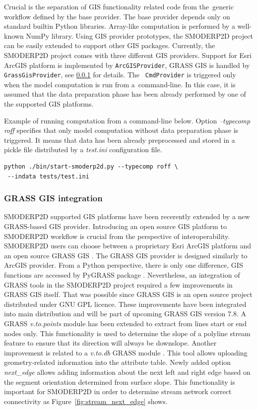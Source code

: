 Crucial is the separation of GIS functionality related code from
the~generic workflow defined by the base provider. The base provider
depends only on standard builtin Python libraries. Array-like
computation is performed by a well-known NumPy library. Using GIS
provider prototypes, the SMODERP2D project can be easily extended to
support other GIS packages. Currently, the SMODERP2D project comes
with three different GIS providers. Support for Esri ArcGIS platform
is implemented by {\tt ArcGISProvider}, GRASS GIS is handled by {\tt
  GrassGisProvider}, see \ref{sec:grass_provider} for details. The {\tt
  CmdProvider} is triggered only when the model computation is run
from a~command-line. In this case, it is assumed that the data
preparation phase has been already performed by one of the supported GIS
platforms.

Example of running computation from a command-line below. Option {\it
  --typecomp roff} specifies that only model computation without data
preparation phase is triggered. It means that data has been already
preprocessed and stored in a pickle file distributed by a {\it test.ini}
configuration file.

\begin{verbatim}
python ./bin/start-smoderp2d.py --typecomp roff \
 --indata tests/test.ini
\end{verbatim}

\subsubsection{GRASS GIS integration}\label{sec:grass_provider}
SMODERP2D supported GIS platforms have been recerently extended by a
new GRASS-based GIS provider. Introducing an open source GIS platform
to SMODERP2D workflow is crucial from the perspective of
interoperability. SMODERP2D users can choose between a proprietary
Esri ArcGIS platform and an open source GRASS GIS
\cite{neteler2012grass}. The GRASS GIS provider is designed similarly
to ArcGIS provider. From a Python perspective, there is only one
difference, GIS functions are accessed by PyGRASS package
\cite{ijgi2010201}. Nevertheless, an integration of GRASS tools in the
SMODERP2D project required a few improvements in GRASS GIS
itself. That was possible since GRASS GIS is an open source project
distributed under GNU GPL licence. These improvements have been
integrated into main distribution and will be part of upcoming GRASS
GIS version 7.8. A GRASS {\em v.to.points} module
\cite{v-to-points-2019} has been extended to extract from lines start
or end nodes only. This functionality is used to determine the slope
of a polyline stream feature to ensure that its direction will always
be downslope. Another
improvement is related to a {\em v.to.db} GRASS module
\cite{v-to-db-2019}. This tool allows uploading geometry-related
information into the attribute table. 
Newly added option {\it
next\_edge} allows adding information about the next left and right
edge based on the segment orientation determined from surface slope. 
This functionality is important for SMODERP2D in order to
determine stream network correct connectivity as
Figure~\ref{fig:stream_next_edge} shows.

